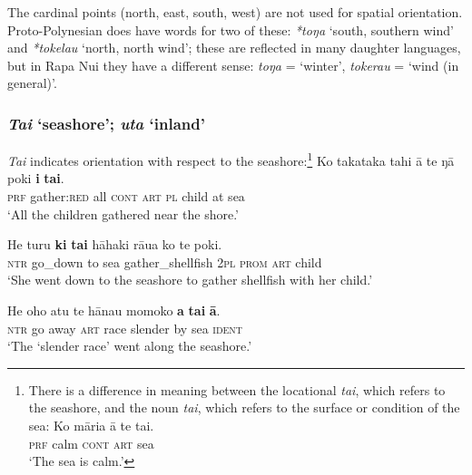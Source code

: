 The cardinal points (north, east, south, west) are not used for spatial orientation. Proto-Polynesian does have words for two of these: \textit{*toŋa} ‘south, southern wind’ and \textit{*tokelau} ‘north, north wind’; these are reflected in many daughter languages, but in Rapa Nui they have a different sense: \textit{toŋa} = ‘winter’, \textit{tokerau} = ‘wind (in general)’.

\subsubsection{\textit{Tai} ‘seashore’; \textit{{\ꞌ}uta} ‘inland’}\label{sec:3.6.3.1}

\textit{Tai} indicates orientation with respect to the seashore:\footnote{\label{fn:153}There is a difference in meaning between the locational \textit{tai}, which refers to the seashore, and the noun \textit{tai}, which refers to the surface or condition of the sea:
\ea
\gll   
Ko māria {\ꞌ}ā te tai. \\
  \textsc{prf} calm \textsc{cont} \textsc{art} sea\\
  \glt 
  ‘The sea is calm.’\zlast}
\ea\label{ex:3.159}
\gll Ko takataka tahi {\ꞌ}ā te ŋā poki \textbf{{\ꞌ}i} \textbf{tai}. \\
\textsc{prf} gather:\textsc{red} all \textsc{cont} \textsc{art} \textsc{pl} child at sea \\

\glt 
‘All the children gathered near the shore.’ \textstyleExampleref{[R161.013]} 
\z

\ea\label{ex:3.160}
\gll He turu \textbf{ki} \textbf{tai} hāhaki rāua ko te poki. \\
\textsc{ntr} go\_down to sea gather\_shellfish \textsc{2pl} \textsc{prom} \textsc{art} child \\

\glt 
‘She went down to the seashore to gather shellfish with her child.’ \textstyleExampleref{[Mtx-7-14.034]}
\z

\ea\label{ex:3.161}
\gll He oho atu te hānau momoko \textbf{a} \textbf{tai} \textbf{{\ꞌ}ā}. \\
\textsc{ntr} go away \textsc{art} race slender by sea \textsc{ident} \\

\glt 
‘The ‘slender race’{\rmfnm} went along the seashore.’ \textstyleExampleref{[Ley-3-06.029]}
\z
{}

